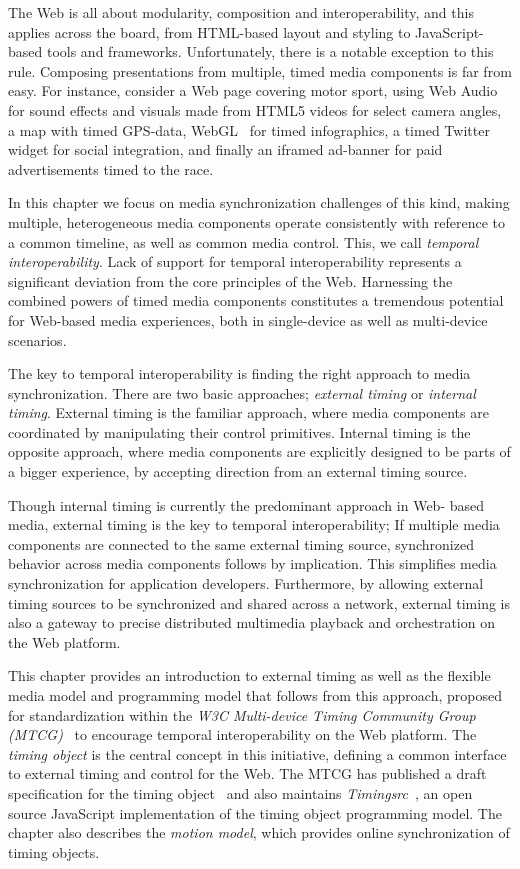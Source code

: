 The Web is all about modularity, composition and interoperability, and this
applies across the board, from HTML-based layout and styling to JavaScript-
based  tools and frameworks. Unfortunately, there is a notable exception to
this rule. Composing presentations from multiple, timed media components is
far from easy. For instance, consider a Web page covering motor sport, using
Web Audio~\cite{webaudio} for sound effects and visuals made from HTML5 videos
for select camera angles, a map with timed GPS-data, WebGL~\cite{webgl} for
timed infographics, a timed Twitter~\cite{twitter} widget for social
integration, and finally an iframed ad-banner for paid advertisements timed to
the race.

In this chapter we focus on media synchronization challenges of this kind,
making multiple, heterogeneous media components operate consistently with
reference to a common timeline, as well as common media control. This, we call
\emph{temporal interoperability}. Lack of support for temporal
interoperability represents a significant deviation from the core principles
of the Web. Harnessing the combined powers of timed media components
constitutes a tremendous potential for Web-based media experiences, both in
single-device as well as multi-device scenarios.

The key to temporal interoperability is finding the right approach to media
synchronization. There are two basic approaches; \emph{external
timing} or \emph{internal timing}. External timing
is the familiar approach, where media components are coordinated by
manipulating their control primitives. Internal timing is the
opposite approach, where media components are explicitly designed to be parts
of a bigger experience, by accepting direction from an external timing source.

Though internal timing is currently the predominant approach in Web-
based media, external timing is the key to temporal interoperability;
If multiple media components are connected to the same external timing source,
synchronized behavior across media components follows by implication. This
simplifies media synchronization for application developers. Furthermore,
by allowing external timing sources to be synchronized and shared across a
network, external timing is also a gateway to precise distributed multimedia
playback and orchestration on the Web platform.

This chapter provides an introduction to external timing as well as the
flexible media model and programming model that follows from this approach,
proposed for standardization within the \emph{W3C Multi-device Timing
Community Group (MTCG)}~\cite{mtcg} to encourage temporal interoperability on
the Web platform. The \emph{timing object} is the central concept in this
initiative, defining a common interface to external timing and control for the
Web. The MTCG has published a draft specification for the timing
object~\cite{timingobject} and also maintains
\emph{Timingsrc}~\cite{timingsrc}, an open source JavaScript implementation of
the timing object programming model. The chapter also describes the
\emph{motion model}, which provides online synchronization of timing objects.

